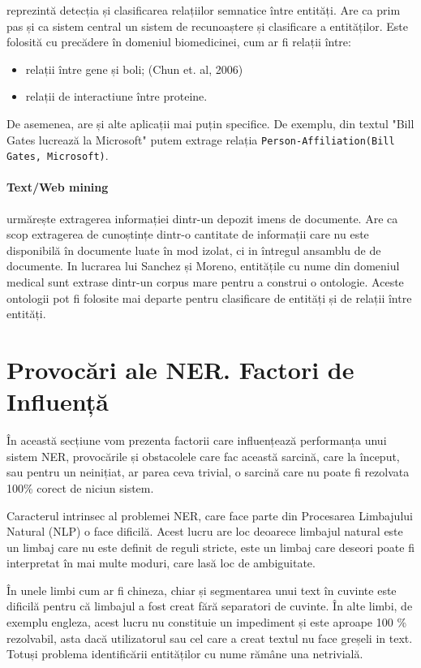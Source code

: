 reprezintă detecția și clasificarea relațiilor semnatice între entități. Are ca prim pas și ca sistem central un sistem de recunoaștere și clasificare a entităților. Este folosită cu precădere în domeniul biomedicinei, cum ar fi relații între:

\begin{itemize}
\item relații între gene și boli; (Chun et. al, 2006)\cite{Chun06extractionof}
\item relații de interactiune între proteine.
\end{itemize}

De asemenea, are și alte aplicații mai puțin specifice. De exemplu, din textul "Bill Gates lucrează la Microsoft" putem extrage relația \texttt{Person-Affiliation(Bill Gates, Microsoft)}.

\paragraph{Text/Web mining}

urmărește extragerea informației dintr-un depozit imens de documente. Are ca scop extragerea de cunoștințe dintr-o cantitate de informații care nu este disponibilă în documente luate în mod izolat, ci in întregul ansamblu de de documente. In lucrarea lui Sanchez și Moreno, entitățile cu nume din domeniul medical sunt extrase dintr-un corpus mare pentru a construi o ontologie. Aceste ontologii pot fi folosite mai departe pentru clasificare de entități și de relații între entități.\cite{sanchez2005}

\section{Provocări ale NER. Factori de Influență}

În această secțiune vom prezenta factorii care influențează performanța unui sistem NER, provocările și obstacolele care fac această sarcină, care la început, sau pentru un neinițiat, ar parea ceva trivial, o sarcină care nu poate fi rezolvata 100\% corect de niciun sistem.


Caracterul intrinsec al problemei NER, care face parte din Procesarea Limbajului Natural (NLP) o face dificilă. Acest lucru are loc deoarece limbajul natural este un limbaj care nu este definit de reguli stricte, este un limbaj care deseori poate fi interpretat în mai multe moduri, care lasă loc de ambiguitate.

În unele limbi cum ar fi chineza, chiar și segmentarea unui text în cuvinte este dificilă pentru că limbajul a fost creat fără separatori de cuvinte. În alte limbi, de exemplu engleza, acest lucru nu constituie un impediment și este aproape 100 \% rezolvabil, asta dacă utilizatorul sau cel care a creat textul nu face greșeli in text. Totuși problema identificării entităților cu nume rămâne una netrivială.

